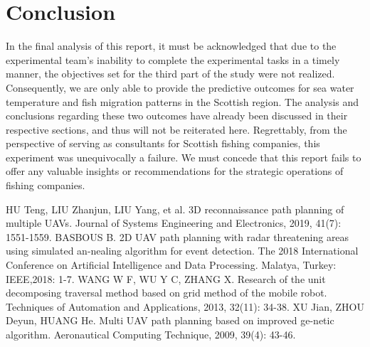 \documentclass[12pt]{article}  %
\begin{document}
\section{Conclusion}
In the final analysis of this report, it must be acknowledged that due to the experimental team's inability to complete the experimental tasks in a timely manner, the objectives set for the third part of the study were not realized. Consequently, we are only able to provide the predictive outcomes for sea water temperature and fish migration patterns in the Scottish region. The analysis and conclusions regarding these two outcomes have already been discussed in their respective sections, and thus will not be reiterated here. Regrettably, from the perspective of serving as consultants for Scottish fishing companies, this experiment was unequivocally a failure. We must concede that this report fails to offer any valuable insights or recommendations for the strategic operations of fishing companies.


\clearpage   %
\begin{thebibliography}{99}
	 HU Teng, LIU Zhanjun, LIU Yang, et al. 3D reconnaissance path planning of multiple UAVs. Journal of Systems Engineering and Electronics, 2019, 41(7): 1551-1559.
	 BASBOUS B. 2D UAV path planning with radar threatening areas using simulated an-nealing algorithm for event detection. The 2018 International Conference on Artificial Intelligence and Data Processing. Malatya, Turkey: IEEE,2018: 1-7.
	 WANG W F, WU Y C, ZHANG X. Research of the unit decomposing traversal method based on grid method of the mobile robot. Techniques of Automation and Applications, 2013, 32(11): 34-38.
	 XU Jian, ZHOU Deyun, HUANG He. Multi UAV path planning based on improved ge-netic algorithm. Aeronautical Computing Technique, 2009, 39(4): 43-46.

\end{thebibliography}
%  
\end{document}
